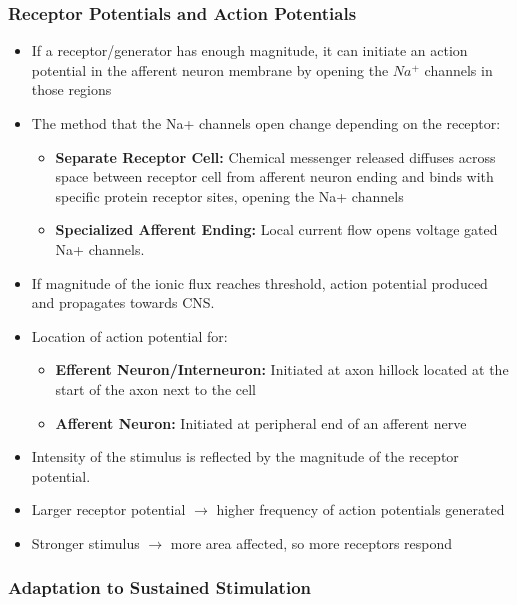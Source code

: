 \documentclass[11pt]{article}
\begin{document}
\subsubsection{Receptor Potentials and Action Potentials}
\begin{itemize}
\item If a receptor/generator has enough magnitude, it can initiate an action potential in the afferent neuron membrane by opening the $Na^+$ channels in those regions
\item The method that the Na+ channels open change depending on the receptor:
\begin{itemize}
\item \textbf{Separate Receptor Cell:} Chemical messenger released diffuses across space between receptor cell from afferent neuron ending and binds with specific protein receptor sites, opening the Na+ channels
\item \textbf{Specialized Afferent Ending:} Local current flow opens voltage gated Na+ channels.
\end{itemize}
\item If magnitude of the ionic flux reaches threshold, action potential produced and propagates towards CNS. 
\item Location of action potential for:
\begin{itemize}
\item \textbf{Efferent Neuron/Interneuron:} Initiated at axon hillock located at the start of the axon next to the cell
\item \textbf{Afferent Neuron:} Initiated at peripheral end of an afferent nerve
\end{itemize} 
\item Intensity of the stimulus is reflected by the magnitude of the receptor potential. 
\item Larger receptor potential $\rightarrow$ higher frequency of action potentials generated 
\item Stronger stimulus 	$\rightarrow$ more area affected, so more receptors respond 

\end{itemize}

\subsubsection{Adaptation to Sustained Stimulation}
\end{document}
